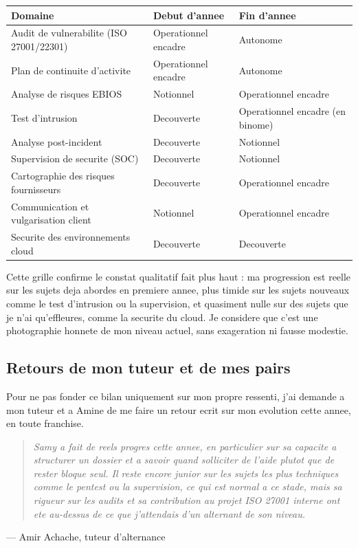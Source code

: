 \documentclass[11pt,a4paper]{article}
\newcommand{\citationperso}[2]{%
\par\smallskip\noindent\begin{quote}\itshape #1\end{quote}
\hfill --- #2\par\smallskip
}
\begin{document}
\begin{center}
\small
\begin{tabular}{@{}p{5.5cm}p{4.4cm}p{4.1cm}@{}}
\toprule
\textbf{Domaine} & \textbf{Debut d'annee} & \textbf{Fin d'annee} \\
\midrule
Audit de vulnerabilite (ISO 27001/22301) & Operationnel encadre & Autonome \\
Plan de continuite d'activite & Operationnel encadre & Autonome \\
Analyse de risques EBIOS & Notionnel & Operationnel encadre \\
Test d'intrusion & Decouverte & Operationnel encadre (en binome) \\
Analyse post-incident & Decouverte & Notionnel \\
Supervision de securite (SOC) & Decouverte & Notionnel \\
Cartographie des risques fournisseurs & Decouverte & Operationnel encadre \\
Communication et vulgarisation client & Notionnel & Operationnel encadre \\
Securite des environnements cloud & Decouverte & Decouverte \\
\bottomrule
\end{tabular}
\end{center}

Cette grille confirme le constat qualitatif fait plus haut : ma progression est reelle sur les sujets deja abordes en premiere annee, plus timide sur les sujets nouveaux comme le test d'intrusion ou la supervision, et quasiment nulle sur des sujets que je n'ai qu'effleures, comme la securite du cloud. Je considere que c'est une photographie honnete de mon niveau actuel, sans exageration ni fausse modestie.

\subsection{Retours de mon tuteur et de mes pairs}

Pour ne pas fonder ce bilan uniquement sur mon propre ressenti, j'ai demande a mon tuteur et a Amine de me faire un retour ecrit sur mon evolution cette annee, en toute franchise.

\citationperso{Samy a fait de reels progres cette annee, en particulier sur sa capacite a structurer un dossier et a savoir quand solliciter de l'aide plutot que de rester bloque seul. Il reste encore junior sur les sujets les plus techniques comme le pentest ou la supervision, ce qui est normal a ce stade, mais sa rigueur sur les audits et sa contribution au projet ISO 27001 interne ont ete au-dessus de ce que j'attendais d'un alternant de son niveau.}{Amir Achache, tuteur d'alternance}
\end{document}
